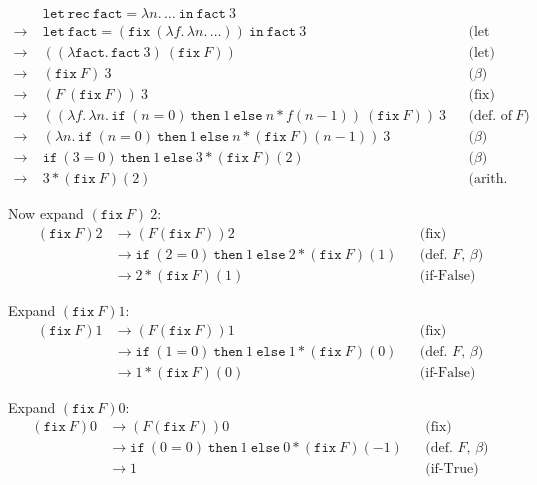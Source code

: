 \documentclass{article}
\theoremstyle{theorem}
\theoremstyle{definition}
\theoremstyle{remark}
\begin{document}
\begin{align*}
&\mathtt{let\ rec}\ \mathtt{fact}=\lambda n.\,\dots\ \mathtt{in}\ \mathtt{fact}\ 3\\
{}\to\;& \mathtt{let}\ \mathtt{fact}=(\mathtt{fix}\ (\lambda f.\,\lambda n.\,\dots))\ \mathtt{in}\ \mathtt{fact}\ 3
&&\text{(let rec)}\\
{}\to\;& ((\lambda \mathtt{fact}.\, \mathtt{fact}\ 3)\ (\mathtt{fix}\ F))
&&\text{(let)}\\
{}\to\;& (\mathtt{fix}\ F)\ 3
&&\text{(\(\beta\))}\\[4pt]
{}\to\;& (F\ (\mathtt{fix}\ F))\ 3
&&\text{(fix)}\\
{}\to\;& ((\lambda f.\,\lambda n.\,\mathtt{if}\ (n=0)\ \mathtt{then}\ 1\ \mathtt{else}\ n * f(n-1))\ (\mathtt{fix}\ F))\ 3
&&\text{(def.\ of \(F\))}\\
{}\to\;& (\lambda n.\,\mathtt{if}\ (n=0)\ \mathtt{then}\ 1\ \mathtt{else}\ n * (\mathtt{fix}\ F)(n-1))\ 3
&&\text{(\(\beta\))}\\
{}\to\;& \mathtt{if}\ (3=0)\ \mathtt{then}\ 1\ \mathtt{else}\ 3 * (\mathtt{fix}\ F)(2)
&&\text{(\(\beta\))}\\
{}\to\;& 3 * (\mathtt{fix}\ F)(2)
&&\text{(arith.\ and if-False)}
\end{align*}

Now expand \((\mathtt{fix}\ F)\ 2\):
\begin{align*}
(\mathtt{fix}\ F)2
&\to (F(\mathtt{fix}\ F))2 &&\text{(fix)}\\
&\to \mathtt{if}\ (2=0)\ \mathtt{then}\ 1\ \mathtt{else}\ 2 * (\mathtt{fix}\ F)(1)
&&\text{(def.\ \(F\), \(\beta\))}\\
&\to 2 * (\mathtt{fix}\ F)(1)
&&\text{(if-False)}
\end{align*}

Expand \((\mathtt{fix}\ F)1\):
\begin{align*}
(\mathtt{fix}\ F)1
&\to (F(\mathtt{fix}\ F))1 &&\text{(fix)}\\
&\to \mathtt{if}\ (1=0)\ \mathtt{then}\ 1\ \mathtt{else}\ 1 * (\mathtt{fix}\ F)(0)
&&\text{(def.\ \(F\), \(\beta\))}\\
&\to 1 * (\mathtt{fix}\ F)(0)
&&\text{(if-False)}
\end{align*}

Expand \((\mathtt{fix}\ F)0\):
\begin{align*}
(\mathtt{fix}\ F)0
&\to (F(\mathtt{fix}\ F))0 &&\text{(fix)}\\
&\to \mathtt{if}\ (0=0)\ \mathtt{then}\ 1\ \mathtt{else}\ 0 * (\mathtt{fix}\ F)(-1)
&&\text{(def.\ \(F\), \(\beta\))}\\
&\to 1
&&\text{(if-True)}
\end{align*}
\end{document}
